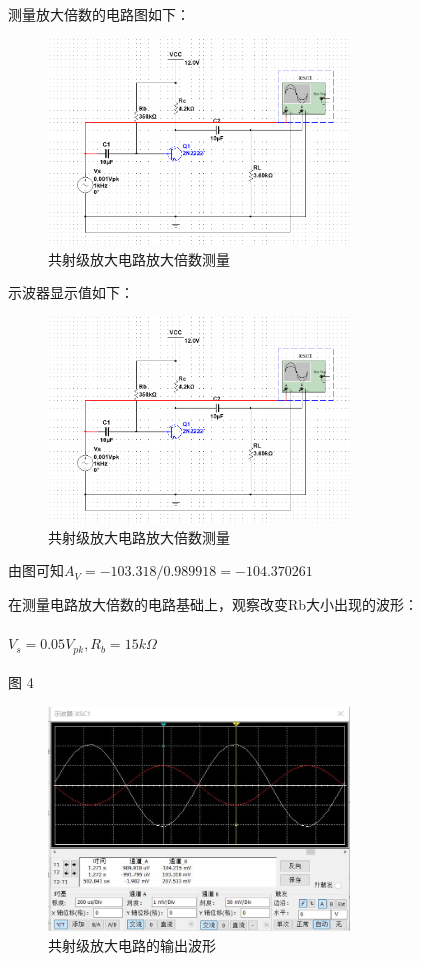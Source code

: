 \documentclass[10pt, conference, compsocconf, a4paper]{IEEEtran}
\begin{document}
测量放大倍数的电路图如下：\par

\begin{figure}[h]
  \includegraphics[width=8cm]{img/b.png}
  \caption{共射级放大电路放大倍数测量}
  \label{共射级放大电路放大倍数测量}
\end{figure}

示波器显示值如下：\par

\begin{figure}[h]
  \includegraphics[width=8cm]{img/b.png}
  \caption{共射级放大电路放大倍数测量}
  \label{共射级放大电路放大倍数测量}
\end{figure}

由图可知$A_V = -103.318 / 0.989918 = -104.370261$ \par
在测量电路放大倍数的电路基础上，观察改变Rb大小出现的波形：\par

\paragraph{$V_s = 0.05V_{pk} , R_b = 15k\Omega$}图 4

\begin{figure}[h]
  \includegraphics[width=8cm]{img/c.png}
  \caption{共射级放大电路的输出波形}
  \label{共射级放大电路的输出波形}
\end{figure}
\end{document}
